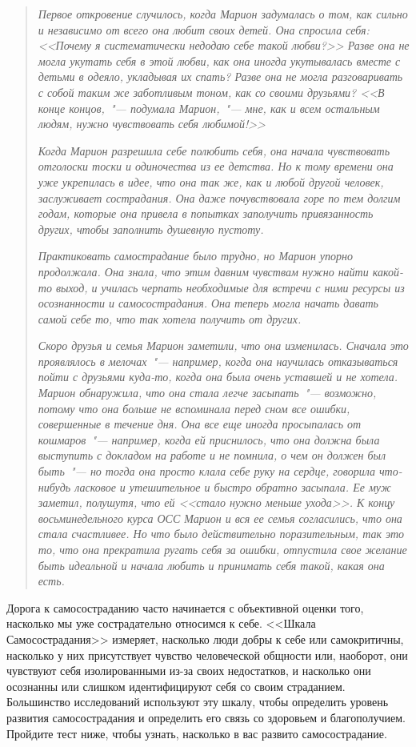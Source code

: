 \begin{quotation}
	\textit{Первое откровение случилось, когда Марион задумалась о том, как сильно и независимо от всего она любит своих детей. Она спросила себя: <<Почему я систематически недодаю себе такой любви?>> Разве она не могла укутать себя в этой любви, как она иногда укутывалась вместе с детьми в одеяло, укладывая их спать? Разве она не могла разговаривать с собой таким же заботливым тоном, как со своими друзьями? <<В конце концов,~"--- подумала Марион,~"--- мне, как и всем остальным людям, нужно чувствовать себя любимой!>>}
	
	\textit{Когда Марион разрешила себе полюбить себя, она начала чувствовать отголоски тоски и одиночества из ее детства. Но к тому времени она уже укрепилась в идее, что она так же, как и любой другой человек, заслуживает сострадания. Она даже почувствовала горе по тем долгим годам, которые она привела в попытках заполучить привязанность других, чтобы заполнить душевную пустоту.}
	
	\textit{Практиковать самострадание было трудно, но Марион упорно продолжала. Она знала, что этим давним чувствам нужно найти какой-то выход, и училась черпать необходимые для встречи с ними ресурсы из осознанности и самосострадания. Она теперь могла начать давать самой себе то, что так хотела получить от других.}
	
	\textit{Скоро друзья и семья Марион заметили, что она изменилась. Сначала это проявлялось в мелочах~"--- например, когда она научилась отказываться пойти с друзьями куда-то, когда она была очень уставшей и не хотела. Марион обнаружила, что она стала легче засыпать~"--- возможно, потому что она больше не вспоминала перед сном все ошибки, совершенные в течение дня. Она все еще иногда просыпалась от кошмаров~"--- например, когда ей приснилось, что она должна была выступить с докладом на работе и не помнила, о чем он должен был быть~"--- но тогда она просто клала себе руку на сердце, говорила что-нибудь ласковое и утешительное и быстро обратно засыпала. Ее муж заметил, полушутя, что ей <<стало нужно меньше ухода>>. К концу восьминедельного курса ОСС Марион и вся ее семья согласились, что она стала счастливее. Но что было действительно поразительным, так это то, что она прекратила ругать себя за ошибки, отпустила свое желание быть идеальной и начала любить и принимать себя такой, какая она есть.}
\end{quotation}

\newpage
{} \label{Ex:The_Self-Compassion_Scale}

Дорога к самосостраданию часто начинается с объективной оценки того, насколько мы уже сострадательно относимся к себе. <<Шкала Самосострадания>> измеряет, насколько люди добры к себе или самокритичны, насколько у них присутствует чувство человеческой общности или, наоборот, они чувствуют себя изолированными из-за своих недостатков, и насколько они осознанны или слишком идентифицируют себя со своим страданием. Большинство исследований используют эту шкалу, чтобы определить уровень развития самосострадания и определить его связь со здоровьем и благополучием. Пройдите тест ниже, чтобы узнать, насколько в вас развито самосострадание. 

